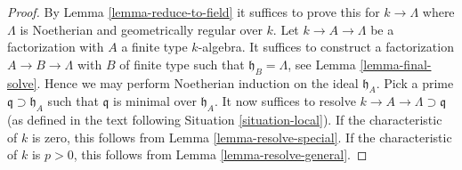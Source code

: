 \begin{proof}
By Lemma \ref{lemma-reduce-to-field}
it suffices to prove this for $k \to \Lambda$
where $\Lambda$ is Noetherian and geometrically regular over $k$.
Let $k \to A \to \Lambda$ be a factorization with $A$ a finite type
$k$-algebra. It suffices to construct a factorization
$A \to B \to \Lambda$ with $B$ of finite type such that
$\mathfrak h_B = \Lambda$, see Lemma \ref{lemma-final-solve}.
Hence we may perform Noetherian induction on the ideal $\mathfrak h_A$.
Pick a prime $\mathfrak q \supset \mathfrak h_A$ such that
$\mathfrak q$ is minimal over $\mathfrak h_A$.
It now suffices to resolve $k \to A \to \Lambda \supset \mathfrak q$
(as defined in the text following Situation \ref{situation-local}).
If the characteristic of $k$ is zero, this follows from
Lemma \ref{lemma-resolve-special}.
If the characteristic of $k$ is $p > 0$, this follows from
Lemma \ref{lemma-resolve-general}.
\end{proof}



















